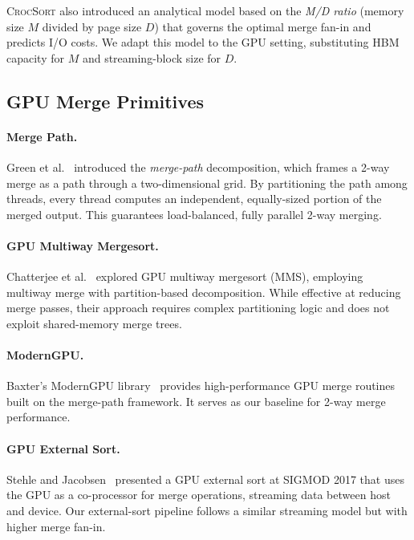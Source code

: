 \documentclass[conference,10pt]{IEEEtran}
\newcommand{\crocsort}{\textsc{CrocSort}\xspace}
\begin{document}
\crocsort also introduced an analytical model based on the \emph{M/D ratio}
(memory size $M$ divided by page size $D$) that governs the optimal merge
fan-in and predicts I/O costs.  We adapt this model to the GPU setting,
substituting HBM capacity for $M$ and streaming-block size for $D$.

\subsection{GPU Merge Primitives}
\label{sec:bg_gpu_merge}

\paragraph{Merge Path.}
Green et al.~\cite{green2012} introduced the \emph{merge-path}
decomposition, which frames a 2-way merge as a path through a
two-dimensional grid.  By partitioning the path among threads, every thread
computes an independent, equally-sized portion of the merged output.  This
guarantees load-balanced, fully parallel 2-way merging.

\paragraph{GPU Multiway Mergesort.}
Chatterjee et al.~\cite{chatterjee2017} explored GPU multiway mergesort
(MMS), employing multiway merge with partition-based decomposition.  While
effective at reducing merge passes, their approach requires complex
partitioning logic and does not exploit shared-memory merge trees.

\paragraph{ModernGPU.}
Baxter's ModernGPU library~\cite{moderngpu2013} provides high-performance
GPU merge routines built on the merge-path framework.  It serves as our
baseline for 2-way merge performance.

\paragraph{GPU External Sort.}
Stehle and Jacobsen~\cite{stehle2017} presented a GPU external sort at
SIGMOD 2017 that uses the GPU as a co-processor for merge operations,
streaming data between host and device.  Our external-sort pipeline follows
a similar streaming model but with higher merge fan-in.


\end{document}
